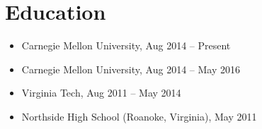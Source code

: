\documentclass[11pt,letter,sans]{moderncv}
\begin{document}
\hypersetup{linkcolor=color0,urlcolor=color1}
\makecvtitle

\vspace{-7mm}
\section{Education}
  \begin{itemize}
      \item Carnegie Mellon University, \hfill Aug 2014 -- Present
      \begin{itemize}
\end{itemize}
      \item Carnegie Mellon University, \hfill Aug 2014 -- May 2016
      \begin{itemize}
\end{itemize}
      \item Virginia Tech, \hfill Aug 2011 -- May 2014
      \begin{itemize}
\end{itemize}
      \item Northside High School (Roanoke, Virginia), \hfill May 2011
      \begin{itemize}
\end{itemize}
  \end{itemize}
\end{document}
